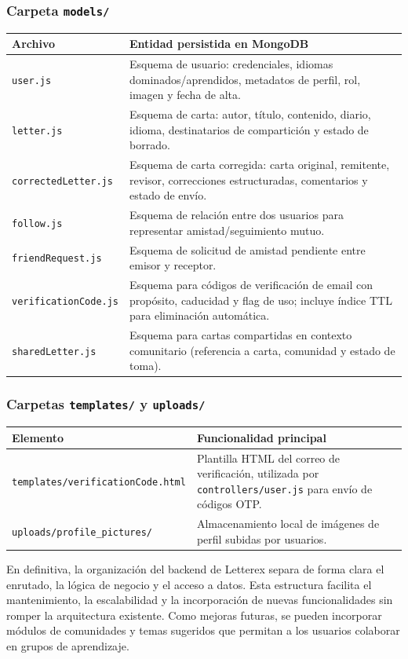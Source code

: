 \subsubsection{Carpeta \texttt{models/}}

\begin{longtable}{|p{3.8cm}|p{10.3cm}|}
\hline
\textbf{Archivo} & \textbf{Entidad persistida en MongoDB} \\
\hline
\texttt{user.js} & Esquema de usuario: credenciales, idiomas dominados/aprendidos, metadatos de perfil, rol, imagen y fecha de alta. \\
\hline
\texttt{letter.js} & Esquema de carta: autor, título, contenido, diario, idioma, destinatarios de compartición y estado de borrado. \\
\hline
\texttt{correctedLetter.js} & Esquema de carta corregida: carta original, remitente, revisor, correcciones estructuradas, comentarios y estado de envío. \\
\hline
\texttt{follow.js} & Esquema de relación entre dos usuarios para representar amistad/seguimiento mutuo. \\
\hline
\texttt{friendRequest.js} & Esquema de solicitud de amistad pendiente entre emisor y receptor. \\
\hline
\texttt{verificationCode.js} & Esquema para códigos de verificación de email con propósito, caducidad y flag de uso; incluye índice TTL para eliminación automática. \\
\hline
\texttt{sharedLetter.js} & Esquema para cartas compartidas en contexto comunitario (referencia a carta, comunidad y estado de toma). \\
\hline
\end{longtable}

\subsubsection{Carpetas \texttt{templates/} y \texttt{uploads/}}

\begin{longtable}{|p{3.8cm}|p{10.3cm}|}
\hline
\textbf{Elemento} & \textbf{Funcionalidad principal} \\
\hline
\texttt{templates/verificationCode.html} & Plantilla HTML del correo de verificación, utilizada por \texttt{controllers/user.js} para envío de códigos OTP. \\
\hline
\texttt{uploads/profile\_pictures/} & Almacenamiento local de imágenes de perfil subidas por usuarios. \\
\hline
\end{longtable}


En definitiva, la organización del backend de Letterex separa de forma clara el enrutado, la lógica de negocio y el acceso a datos.
Esta estructura facilita el mantenimiento, la escalabilidad y la incorporación de nuevas funcionalidades sin romper la arquitectura existente. Como mejoras futuras, se pueden incorporar módulos de comunidades y temas sugeridos que permitan a los usuarios colaborar en grupos de aprendizaje.
